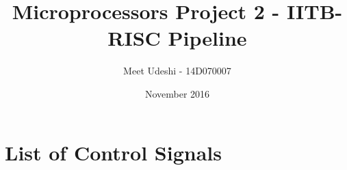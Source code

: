 \documentclass{article}
\title{Microprocessors Project 2 - IITB-RISC Pipeline}
\author{Meet Udeshi - 14D070007}
\date{November 2016}
\begin{document}
\maketitle

\section*{List of Control Signals}
\end{document}
